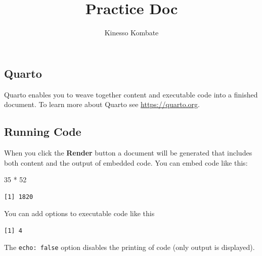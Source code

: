 \documentclass[
  letterpaper,
  DIV=11,
  numbers=noendperiod]{scrartcl}
\title{Practice Doc}
\author{Kinesso Kombate}
\date{}
\newenvironment{Shaded}{\begin{snugshade}}{\end{snugshade}}
\newcommand{\DecValTok}[1]{\textcolor[rgb]{0.68,0.00,0.00}{#1}}
\newcommand{\SpecialCharTok}[1]{\textcolor[rgb]{0.37,0.37,0.37}{#1}}
\begin{document}
\maketitle


\subsection{Quarto}\label{quarto}

Quarto enables you to weave together content and executable code into a
finished document. To learn more about Quarto see
\url{https://quarto.org}.

\subsection{Running Code}\label{running-code}

When you click the \textbf{Render} button a document will be generated
that includes both content and the output of embedded code. You can
embed code like this:

\begin{Shaded}
\begin{Highlighting}[]
\DecValTok{35} \SpecialCharTok{*} \DecValTok{52}
\end{Highlighting}
\end{Shaded}

\begin{verbatim}
[1] 1820
\end{verbatim}

You can add options to executable code like this

\begin{verbatim}
[1] 4
\end{verbatim}

The \texttt{echo:\ false} option disables the printing of code (only
output is displayed).
\end{document}

